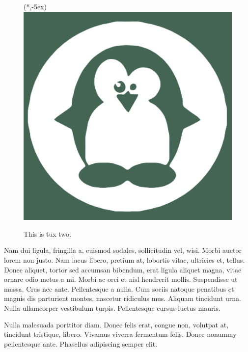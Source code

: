 \documentclass[a4paper]{article}
\begin{document}
\begin{figure}
\xbox(*,-5ex){\includegraphics[width=\linewidth]{tux.png}}
\caption{\label{fig:frog2}This is tux two.}
\end{figure}

Nam dui ligula, fringilla a, euismod sodales, sollicitudin vel, wisi. Morbi auctor lorem non justo. Nam lacus libero, pretium at, lobortis vitae, ultricies et, tellus. Donec aliquet, tortor sed accumsan bibendum, erat ligula aliquet magna, vitae ornare odio metus a mi. Morbi ac orci et nisl hendrerit mollis. Suspendisse ut massa. Cras nec ante. Pellentesque a nulla. Cum sociis natoque penatibus et magnis dis parturient montes, nascetur ridiculus mus. Aliquam tincidunt urna. Nulla ullamcorper vestibulum turpis. Pellentesque cursus luctus mauris.

Nulla malesuada porttitor diam. Donec felis erat, congue non, volutpat at, tincidunt tristique, libero. Vivamus viverra fermentum felis. Donec nonummy pellentesque ante. Phasellus adipiscing semper elit. 
  
\end{document}
